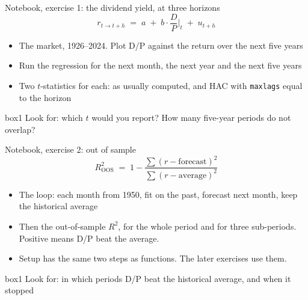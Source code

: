 \documentclass[aspectratio=169,10pt]{beamer}
\begin{document}
\begin{frame}{Notebook, exercise 1: the dividend yield, at three horizons}
\[ r_{t \to t+h} \;=\; a \;+\; b\cdot \frac{D}{P}\Big|_{t} \;+\; u_{t+h} \]
\vskip 2pt
\begin{itemize}
\item The market, 1926--2024. Plot D/P against the return over the next five years
\vskip 6pt
\item Run the regression for the next month, the next year and the next five years
\vskip 6pt
\item Two $t$-statistics for each: as usually computed, and HAC with \texttt{maxlags} equal to the horizon
\end{itemize}
\vskip 12pt
\begin{beamercolorbox}[rounded=true,sep=7pt,center]{box1}
Look for: which $t$ would you report? How many five-year periods do not overlap?
\end{beamercolorbox}
\end{frame}

\begin{frame}{Notebook, exercise 2: out of sample}
\[ R^{2}_{\text{OOS}} \;=\; 1 - \frac{\sum \left(r - \text{forecast}\right)^{2}}{\sum \left(r - \text{average}\right)^{2}} \]
\vskip 2pt
\begin{itemize}
\item The loop: each month from 1950, fit on the past, forecast next month, keep the historical average
\vskip 6pt
\item Then the out-of-sample $R^{2}$, for the whole period and for three sub-periods. Positive means D/P beat the average.
\vskip 6pt
\item Setup has the same two steps as functions. The later exercises use them.
\end{itemize}
\vskip 12pt
\begin{beamercolorbox}[rounded=true,sep=7pt,center]{box1}
Look for: in which periods D/P beat the historical average, and when it stopped
\end{beamercolorbox}
\end{frame}
\end{document}
